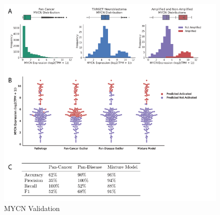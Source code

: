 \documentclass[fleqn,10pt]{wlscirep}
\begin{document}

\begin{figure}
	\centering
	\includegraphics[width=0.75\linewidth]{images/MYCN-Figure.png}
	\caption{MYCN Validation}
	\label{sfig:mycn}
\end{figure}
\end{document}
